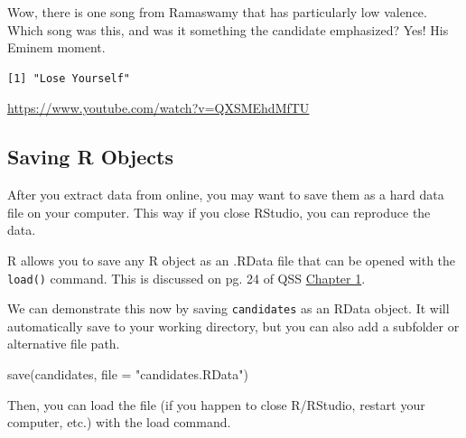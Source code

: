\documentclass[
  letterpaper,
  DIV=11,
  numbers=noendperiod]{scrreprt}
\newenvironment{Shaded}{\begin{snugshade}}{\end{snugshade}}
\newcommand{\AttributeTok}[1]{\textcolor[rgb]{0.40,0.45,0.13}{#1}}
\newcommand{\FunctionTok}[1]{\textcolor[rgb]{0.28,0.35,0.67}{#1}}
\newcommand{\NormalTok}[1]{\textcolor[rgb]{0.00,0.23,0.31}{#1}}
\newcommand{\OtherTok}[1]{\textcolor[rgb]{0.00,0.23,0.31}{#1}}
\newcommand{\SpecialCharTok}[1]{\textcolor[rgb]{0.37,0.37,0.37}{#1}}
\newcommand{\StringTok}[1]{\textcolor[rgb]{0.13,0.47,0.30}{#1}}
\begin{document}
Wow, there is one song from Ramaswamy that has particularly low valence.
Which song was this, and was it something the candidate emphasized? Yes!
His Eminem moment.

\begin{Shaded}
\end{Shaded}

\begin{verbatim}
[1] "Lose Yourself"
\end{verbatim}

\url{https://www.youtube.com/watch?v=QXSMEhdMfTU}

\hypertarget{saving-r-objects}{%
\subsection{Saving R Objects}\label{saving-r-objects}}

After you extract data from online, you may want to save them as a hard
data file on your computer. This way if you close RStudio, you can
reproduce the data.

R allows you to save any R object as an .RData file that can be opened
with the \texttt{load()} command. This is discussed on pg. 24 of QSS
\href{https://assets.press.princeton.edu/chapters/s11025.pdf}{Chapter
1}.

We can demonstrate this now by saving \texttt{candidates} as an RData
object. It will automatically save to your working directory, but you
can also add a subfolder or alternative file path.

\begin{Shaded}
\begin{Highlighting}[]
\FunctionTok{save}\NormalTok{(candidates, }\AttributeTok{file =} \StringTok{"candidates.RData"}\NormalTok{)}
\end{Highlighting}
\end{Shaded}

Then, you can load the file (if you happen to close R/RStudio, restart
your computer, etc.) with the load command.
\end{document}
